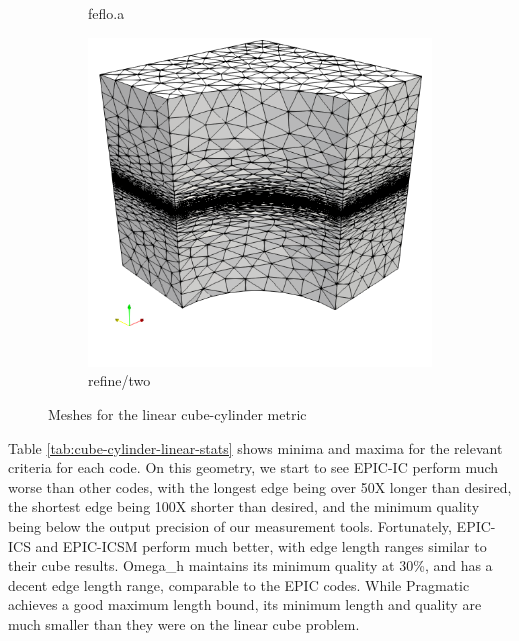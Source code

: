 \documentclass[3p,times,procedia,number]{elsarticle}
\begin{document}
\begin{figure}
\begin{subfigure}{.24\textwidth}
\caption{feflo.a}
\end{subfigure}
\begin{subfigure}{.24\textwidth}
\centering
\includegraphics[width=\textwidth]{refine-two-cube-cylinder-linear.png}
\caption{refine/two}
\end{subfigure}
\caption{Meshes for the linear cube-cylinder metric}
\label{fig:cube-cylinder-linear-meshes}
\end{figure}

Table \ref{tab:cube-cylinder-linear-stats} shows minima
and maxima for the relevant criteria for each code.
On this geometry, we start to see EPIC-IC perform much
worse than other codes, with the longest edge being over
50X longer than desired, the shortest edge being
100X shorter than desired, and the minimum quality being
below the output precision of our measurement tools.
Fortunately, EPIC-ICS and EPIC-ICSM perform much better,
with edge length ranges similar to their cube results.
Omega\_h maintains its minimum quality at 30\%, and
has a decent edge length range, comparable to the EPIC codes.
While Pragmatic achieves a good maximum length bound,
its minimum length and quality are much smaller than they
were on the linear cube problem.
\end{document}
